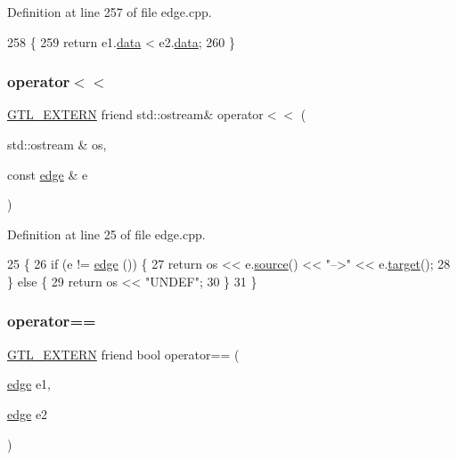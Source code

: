 Definition at line 257 of file edge.\+cpp.


\begin{DoxyCode}
258 \{
259     \textcolor{keywordflow}{return} e1.\mbox{\hyperlink{classedge_a0ebb6dfa28b77f47529085049352b436}{data}} < e2.\mbox{\hyperlink{classedge_a0ebb6dfa28b77f47529085049352b436}{data}};
260 \}
\end{DoxyCode}
\mbox{\label{classedge_a0a878a3109271a41da15ba1c926406d1}} 
\subsubsection{\texorpdfstring{operator$<$$<$}{operator<<}}
{\footnotesize\ttfamily \mbox{\hyperlink{_g_t_l_8h_a014cd1e9b3e67a78ae433eda95c8fd25}{G\+T\+L\+\_\+\+E\+X\+T\+E\+RN}} friend std\+::ostream\& operator$<$$<$ (\begin{DoxyParamCaption}\item[{std\+::ostream \&}]{os,  }\item[{const \mbox{\hyperlink{classedge}{edge}} \&}]{e }\end{DoxyParamCaption})\hspace{0.3cm}{\ttfamily [friend]}}



Definition at line 25 of file edge.\+cpp.


\begin{DoxyCode}
25                                                                   \{
26     \textcolor{keywordflow}{if} (e != \mbox{\hyperlink{classedge}{edge}} ()) \{
27     \textcolor{keywordflow}{return} os << e.\mbox{\hyperlink{classedge_ae82d5701f7e6f71edc3c8b0e34bcd2b7}{source}}() << \textcolor{stringliteral}{"-->"} << e.\mbox{\hyperlink{classedge_a97563b611261478ee19c6ce055f1a3ee}{target}}();
28     \} \textcolor{keywordflow}{else} \{
29     \textcolor{keywordflow}{return} os << \textcolor{stringliteral}{"UNDEF"};
30     \}
31 \}
\end{DoxyCode}
\mbox{\label{classedge_a78a6fd635e7d716ac256f4aac2ef5e4e}} 
\subsubsection{\texorpdfstring{operator==}{operator==}}
{\footnotesize\ttfamily \mbox{\hyperlink{_g_t_l_8h_a014cd1e9b3e67a78ae433eda95c8fd25}{G\+T\+L\+\_\+\+E\+X\+T\+E\+RN}} friend bool operator== (\begin{DoxyParamCaption}\item[{\mbox{\hyperlink{classedge}{edge}}}]{e1,  }\item[{\mbox{\hyperlink{classedge}{edge}}}]{e2 }\end{DoxyParamCaption})\hspace{0.3cm}{\ttfamily [friend]}}



